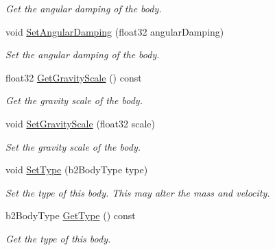 \begin{DoxyCompactItemize}
\begin{DoxyCompactList}\small\item\em Get the angular damping of the body. \end{DoxyCompactList}\item 
\mbox{\label{classb2Body_a73a79541b18394fa224d2eae8ad493e8}} 
void \hyperlink{classb2Body_a73a79541b18394fa224d2eae8ad493e8}{Set\+Angular\+Damping} (float32 angular\+Damping)
\begin{DoxyCompactList}\small\item\em Set the angular damping of the body. \end{DoxyCompactList}\item 
\mbox{\label{classb2Body_aa570b2310248b4b3bd776836e839bc45}} 
float32 \hyperlink{classb2Body_aa570b2310248b4b3bd776836e839bc45}{Get\+Gravity\+Scale} () const
\begin{DoxyCompactList}\small\item\em Get the gravity scale of the body. \end{DoxyCompactList}\item 
\mbox{\label{classb2Body_a8e66a570c2aeee93b29d84cae861a612}} 
void \hyperlink{classb2Body_a8e66a570c2aeee93b29d84cae861a612}{Set\+Gravity\+Scale} (float32 scale)
\begin{DoxyCompactList}\small\item\em Set the gravity scale of the body. \end{DoxyCompactList}\item 
\mbox{\label{classb2Body_a34ff1c84b10b74eb990749a025a1b1ad}} 
void \hyperlink{classb2Body_a34ff1c84b10b74eb990749a025a1b1ad}{Set\+Type} (b2\+Body\+Type type)
\begin{DoxyCompactList}\small\item\em Set the type of this body. This may alter the mass and velocity. \end{DoxyCompactList}\item 
\mbox{\label{classb2Body_a9c2234b5a5fff91305a65ecd0cf0ee59}} 
b2\+Body\+Type \hyperlink{classb2Body_a9c2234b5a5fff91305a65ecd0cf0ee59}{Get\+Type} () const
\begin{DoxyCompactList}\small\item\em Get the type of this body. \end{DoxyCompactList}\item 

\end{DoxyCompactItemize}
